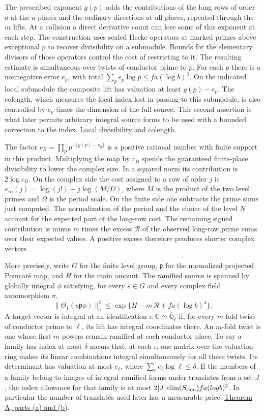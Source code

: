 \documentclass[11pt,letterpaper]{article}
\newcommand{\sref}[2]{\href{https://github.com/VladimirReshetnikov/ProveIt/blob/d8415e76ad850651f8c0083afe689dd9f4a45a10/Analysis/GeneralizedRiemannHypothesis/vendor/grh-lean/grh/src/#1.lean}{#2}}
\newcommand{\upperref}[2]{\sref{#1}{#2}}
\begin{document}
The prescribed exponent $g(p)$ adds the contributions of the long rows of order $a$ at the $a$-places and the ordinary directions at all places, repeated through the $m$ lifts. At a collision a direct derivative count can lose some of this exponent at each step. The construction uses scaled Hecke operators at marked primes above exceptional $p$ to recover divisibility on a submodule. Bounds for the elementary divisors of those operators control the cost of restricting to it. The resulting estimate is simultaneous over twists of conductor prime to $p$. For each $p$ there is a nonnegative error $e_p$, with total $\sum_p e_p\log p\leq f a(\log b)^3$. On the indicated local submodule the composite lift has valuation at least $g(p)-e_p$. The colength, which measures the local index lost in passing to this submodule, is also controlled by $e_p$ times the dimension of the full source. This second assertion is what later permits arbitrary integral source forms to be used with a bounded correction to the index. \upperref{New/UpperBound/Divisibility/LocalDivisibility}{Local divisibility and colength}.

The factor $c_B=\prod_p p^{-\lfloor g(p)-e_p\rfloor}$ is a positive rational number with finite support in this product. Multiplying the map by $c_B$ spends the guaranteed finite-place divisibility to lower the complex size. In a squared norm its contribution is $2\log c_B$. On the complex side the cost assigned to a row of order $j$ is $s_\infty(j)=\log(j!)+j\log(M/\Omega)$, where $M$ is the product of the two level primes and $\Omega$ is the period scale. On the finite side one subtracts the prime sums just computed. The normalization of the period and the choice of the level $N$ account for the expected part of the long-row cost. The remaining signed contribution is minus $m$ times the excess $\mathcal R$ of the observed long-row prime sums over their expected values. A positive excess therefore produces shorter complex vectors.

More precisely, write $G$ for the finite level group, $\mathfrak p$ for the normalized projected Poincar\'e map, and $H$ for the main amount. The ramified source is spanned by globally integral $\phi$ satisfying, for every $s\in G$ and every complex field automorphism $\sigma$,
\[
  \bigl\|\Theta_1(s\mathfrak p\phi)\bigr\|_\sigma^2
       \leq \exp\{H-m\,\mathcal R+fa(\log b)^4\}.
\]
A target vector is integral at an identification $\iota:\mathbb C\simeq\overline{\mathbb Q}_\ell$ if, for every $m$-fold twist of conductor prime to $\ell$, its lift has integral coordinates there. An $m$-fold twist is one whose first $m$ powers remain ramified at each conductor place. To say a family has index at most $\delta$ means that, at each $\iota$, one matrix over the valuation ring makes its linear combinations integral simultaneously for all these twists. Its determinant has valuation at most $e_\ell$, where $\sum_\ell e_\ell\log\ell\le\delta$. If the members of a family belong to images of integral ramified forms under translates from a set $J$, the index allowance for that family is at most $2|J|\dim(S_{\rm ram})fa(\log b)^3$. In particular the number of translates used later has a measurable price. \upperref{New/Reduction/ShortAndEnough}{Theorem A, parts (a) and (b)}.
\end{document}
